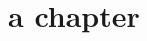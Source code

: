 \documentclass{book}
\newcommand{\Texinfothechapterheading}{}
\newcommand{\Texinfoheadingchaptername}{\chaptername}
\newcommand{\Texinfochapter}[1]{\chapter{#1}
\renewcommand{\Texinfothechapterheading}{\Texinfoheadingchaptername{} \thechapter{} }%
}%
\renewcommand{\_}{\Texinfounderscore\discretionary{}{}{}}
\begin{document}
\label{anchor:first}%


\label{anchor:node-in-menu-before-top}%

\label{anchor:Top}%
\Texinfochapter{{a chapter}}
\label{anchor:second-node}%
\end{document}
